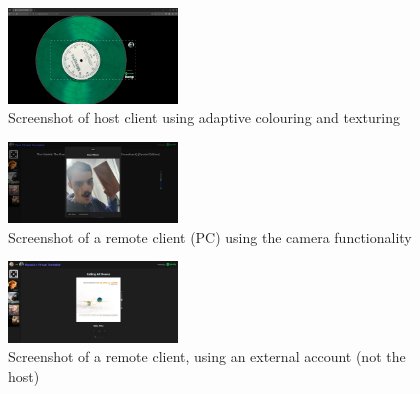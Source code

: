 \begin{uomappendix}
            \begin{figure}[h]
                \centering
                \includegraphics[width=0.4\textwidth]{images/screenshots/HOST_Green.png}
                \caption{Screenshot of host client using adaptive colouring and texturing}
                \label{fig:hostGreen}
            \end{figure}
            
            \begin{figure}[h]
                \centering
                \includegraphics[width=0.4\textwidth]{images/screenshots/LAPTOP_Cam.png}
                \caption{Screenshot of a remote client (PC) using the camera functionality}
                \label{fig:laptopCam}
            \end{figure}
            
            \begin{figure}[h]
                \centering
                \includegraphics[width=0.4\textwidth]{images/screenshots/LAPTOP_External.png}
                \caption{Screenshot of a remote client, using an external account (not the host)}
                \label{fig:laptopExternal}
            \end{figure}
            

\end{uomappendix}
